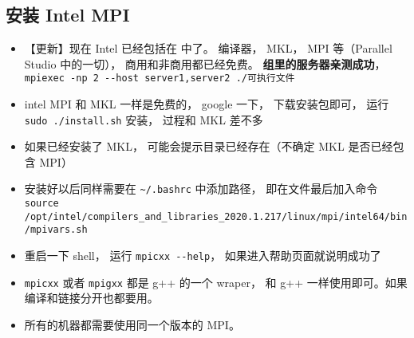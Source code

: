 \subsection{安装 Intel MPI}
\begin{itemize}
\item 【更新】现在 Intel 已经包括在  中了。 编译器， MKL， MPI 等（Parallel Studio 中的一切）， 商用和非商用都已经免费。 \textbf{组里的服务器亲测成功}， \verb|mpiexec -np 2 --host server1,server2 ./可执行文件|
\item intel MPI 和 MKL 一样是免费的， google 一下， 下载安装包即可， 运行 \verb`sudo ./install.sh` 安装， 过程和 MKL 差不多
\item 如果已经安装了 MKL， 可能会提示目录已经存在（不确定 MKL 是否已经包含 MPI）
\item 安装好以后同样需要在 \verb`~/.bashrc` 中添加路径， 即在文件最后加入命令 \verb`source /opt/intel/compilers_and_libraries_2020.1.217/linux/mpi/intel64/bin/mpivars.sh`
\item 重启一下 shell， 运行 \verb`mpicxx --help`， 如果进入帮助页面就说明成功了
\item \verb`mpicxx` 或者 \verb`mpigxx` 都是 g++ 的一个 wraper， 和 g++ 一样使用即可。如果编译和链接分开也都要用。
\item 所有的机器都需要使用同一个版本的 MPI。
\end{itemize}


